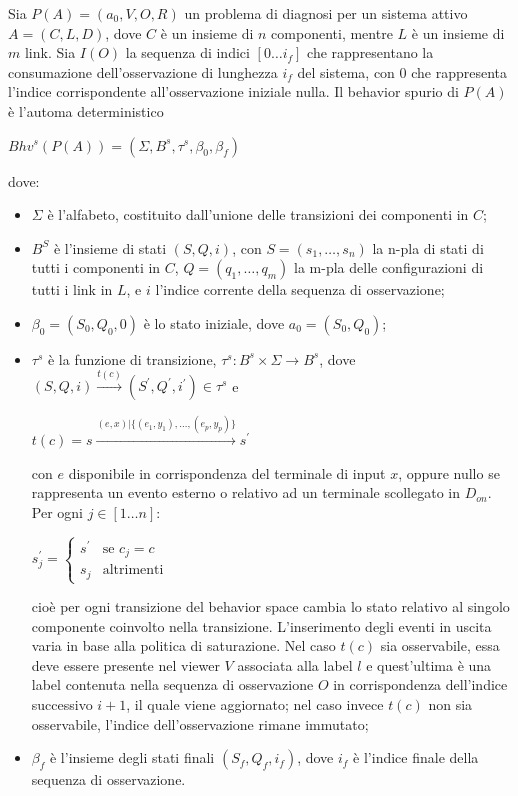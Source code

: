 \begin{defn}
Sia $P(A) = (a_0,V,O,R)$ un problema di diagnosi per un sistema attivo $A = (C,L,D)$, dove $C$ è un insieme di $n$ componenti, mentre $L$ è un insieme di $m$ link. Sia $I(O)$ la sequenza di indici $[0 \ldots i_f]$ che rappresentano la consumazione dell'osservazione di lunghezza $i_f$ del sistema, con $0$ che rappresenta l'indice corrispondente all'osservazione iniziale nulla. Il behavior spurio di $P(A)$ è l'automa deterministico
\begin{center}
	$Bhv^s(P(A)) = (\Sigma,B^s,\tau^s,\beta_0,\beta_f)$
\end{center}
dove:
\begin{itemize}
\item $\Sigma$ è l'alfabeto, costituito dall'unione delle transizioni dei componenti in $C$;
\item $B^S$ è l'insieme di stati $(S,Q,i)$, con $S = (s_1,\ldots,s_n)$ la n-pla di stati di tutti i componenti in $C$, $Q = (q_1,\ldots,q_m)$ la m-pla delle configurazioni di tutti i link in $L$, e $i$ l'indice corrente della sequenza di osservazione;
\item $\beta_0 = (S_0,Q_0,0)$ è lo stato iniziale, dove $a_0 = (S_0,Q_0)$;
\item $\tau^s$ è la funzione di transizione, $\tau^s: B^s \times \Sigma \rightarrow B^s$, dove $(S,Q,i) \xrightarrow{t(c)} (S^\prime,Q^\prime,i^\prime) \in \tau^s$ e 
\begin{center}
	$t(c) = s \xrightarrow{(e,x) | \{(e_1,y_1), \ldots, (e_p,y_p)\}} s^\prime$
\end{center}
con $e$ disponibile in corrispondenza del terminale di input $x$, oppure nullo se rappresenta un evento esterno o relativo ad un terminale scollegato in $D_{on}$.
Per ogni $j \in [1 \ldots n]$:
\begin{center}
$s^\prime_j = \begin{cases} s^\prime & \mbox{se }c_j = c\\ s_j & \mbox{altrimenti} \end{cases}$
\end{center}
cioè per ogni transizione del behavior space cambia lo stato relativo al singolo componente coinvolto nella transizione.
L'inserimento degli eventi in uscita varia in base alla politica di saturazione.
Nel caso $t(c)$ sia osservabile, essa deve essere presente nel viewer $V$ associata alla label $l$ e quest'ultima è una label contenuta nella sequenza di osservazione $O$ in corrispondenza dell'indice successivo $i+1$, il quale viene aggiornato; nel caso invece $t(c)$ non sia osservabile, l'indice dell'osservazione rimane immutato;
\item $\beta_f$ è l'insieme degli stati finali $(S_f,Q_f,i_f)$, dove $i_f$ è l'indice finale della sequenza di osservazione.
\end{itemize}
\end{defn}
